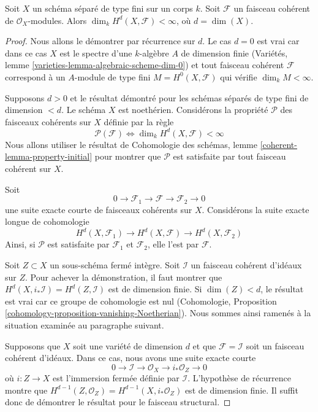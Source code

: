 \begin{lemma}
\label{lemma-top-cohomology-coherent}
Soit $X$ un sch\'ema s\'epar\'e de type fini sur un corps $k$.
Soit $\mathcal{F}$ un faisceau coh\'erent de $\mathcal{O}_X$-modules.
Alors $\dim_k H^d(X, \mathcal{F}) < \infty$, o\`u $d = \dim(X)$.
\end{lemma}

\begin{proof}
Nous allons le d\'emontrer par r\'ecurrence sur $d$. Le cas $d = 0$ est vrai car
dans ce cas $X$ est le spectre d'une $k$-alg\`ebre $A$ de dimension finie
(Variétés, lemme \ref{varieties-lemma-algebraic-scheme-dim-0})
et tout faisceau coh\'erent $\mathcal{F}$ correspond \`a un $A$-module de type fini
$M = H^0(X, \mathcal{F})$ qui v\'erifie $\dim_k M < \infty$.

\medskip\noindent
Supposons $d > 0$ et le r\'esultat d\'emontr\'e pour les sch\'emas s\'epar\'es
de type fini de dimension $< d$. Le sch\'ema $X$ est noeth\'erien. Consid\'erons
la propri\'et\'e $\mathcal{P}$ des faisceaux coh\'erents sur $X$ d\'efinie par la r\`egle
$$
\mathcal{P}(\mathcal{F}) \Leftrightarrow
\dim_k H^d(X, \mathcal{F}) < \infty
$$
Nous allons utiliser le r\'esultat de
Cohomologie des schémas, lemme \ref{coherent-lemma-property-initial}
pour montrer que $\mathcal{P}$ est satisfaite par tout faisceau coh\'erent sur $X$.

\medskip\noindent
Soit
$$
0 \to \mathcal{F}_1 \to \mathcal{F} \to \mathcal{F}_2 \to 0
$$
une suite exacte courte de faisceaux coh\'erents sur $X$.
Consid\'erons la suite exacte longue de cohomologie
$$
H^d(X, \mathcal{F}_1) \to
H^d(X, \mathcal{F}) \to
H^d(X, \mathcal{F}_2)
$$
Ainsi, si $\mathcal{P}$ est satisfaite par $\mathcal{F}_1$ et $\mathcal{F}_2$,
elle l'est par $\mathcal{F}$.

\medskip\noindent
Soit $Z \subset X$ un sous-sch\'ema ferm\'e int\`egre. Soit $\mathcal{I}$
un faisceau coh\'erent d'id\'eaux sur $Z$. Pour achever la d\'emonstration, il faut montrer
que $H^d(X, i_*\mathcal{I}) = H^d(Z, \mathcal{I})$ est de dimension finie.
Si $\dim(Z) < d$, le r\'esultat est vrai car ce groupe de cohomologie
est nul (Cohomologie, Proposition
\ref{cohomology-proposition-vanishing-Noetherian}).
Nous sommes ainsi ramen\'es \`a la situation examin\'ee au paragraphe suivant.

\medskip\noindent
Supposons que $X$ soit une vari\'et\'e de dimension $d$ et que
$\mathcal{F} = \mathcal{I}$ soit un faisceau coh\'erent d'id\'eaux. Dans ce
cas, nous avons une suite exacte courte
$$
0 \to \mathcal{I} \to \mathcal{O}_X \to i_*\mathcal{O}_Z \to 0
$$
o\`u $i : Z \to X$ est l'immersion ferm\'ee d\'efinie par $\mathcal{I}$.
L'hypoth\`ese de r\'ecurrence montre que
$H^{d - 1}(Z, \mathcal{O}_Z) = H^{d - 1}(X, i_*\mathcal{O}_Z)$ est
de dimension finie. Il suffit donc de d\'emontrer le r\'esultat
pour le faisceau structural.


\end{proof}
